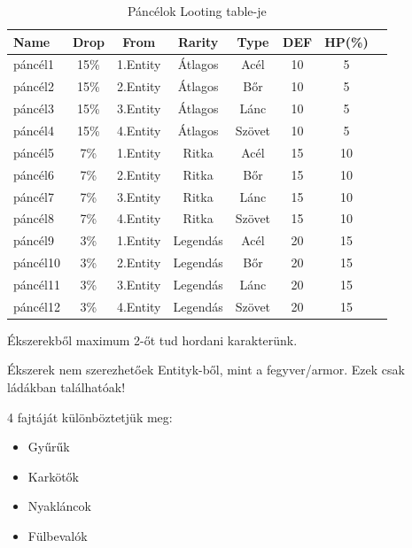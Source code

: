 \begin{table}[!ht]
\centering
\caption{Páncélok Looting table-je}
\label{tab:table4}
\begin{tabular}{|l|c|c|c|c|c|c|c|}
\hline
 Name & Drop & From  & Rarity & Type & DEF & HP(\%) \\
\hline
 páncél1 & 15\% & 1.Entity & Átlagos & Acél & 10 & 5 \\
\hline
 páncél2 & 15\% & 2.Entity & Átlagos & Bőr & 10 & 5 \\
\hline
 páncél3 & 15\% & 3.Entity & Átlagos & Lánc& 10 & 5\\
\hline
 páncél4 & 15\% & 4.Entity & Átlagos  & Szövet & 10 & 5\\
\hline
 páncél5 & 7\% & 1.Entity & Ritka & Acél & 15 & 10 \\
\hline
 páncél6 & 7\% & 2.Entity & Ritka & Bőr & 15 & 10 \\
\hline
 páncél7 & 7\% & 3.Entity & Ritka & Lánc & 15 & 10 \\
\hline
 páncél8 & 7\% & 4.Entity & Ritka  & Szövet & 15 & 10\\
 \hline
 páncél9 & 3\% & 1.Entity & Legendás & Acél & 20 & 15 \\
\hline
 páncél10 & 3\% & 2.Entity & Legendás & Bőr & 20 & 15 \\
\hline
 páncél11 & 3\% & 3.Entity & Legendás & Lánc & 20 & 15\\
\hline
 páncél12 & 3\% & 4.Entity & Legendás  & Szövet & 20 & 15\\
\hline
\end{tabular}
\end{table}

\noindent Ékszerekből maximum 2-őt tud hordani karakterünk.

\noindent Ékszerek nem szerezhetőek Entityk-ből, mint a fegyver/armor. Ezek csak ládákban találhatóak!

4 fajtáját különböztetjük meg:

\begin{itemize}
  \item Gyűrűk
  \item Karkötők
  \item Nyakláncok
  \item Fülbevalók
\end{itemize}

